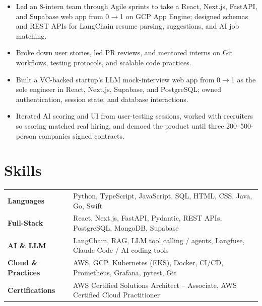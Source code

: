 \documentclass[11pt, letterpaper]{article}
\begin{document}
\vspace{1pt}
\begin{itemize}
  \item Led an 8-intern team through Agile sprints to take a React, Next.js, FastAPI, and Supabase web app from 0$\to$1 on GCP App Engine; designed schemas and REST APIs for LangChain resume parsing, suggestions, and AI job matching.
  \item Broke down user stories, led PR reviews, and mentored interns on Git workflows, testing protocols, and scalable code practices.
\end{itemize}

\vspace{1pt}
\begin{itemize}
  \item Built a VC-backed startup's LLM mock-interview web app from 0$\to$1 as the sole engineer in React, Next.js, Supabase, and PostgreSQL; owned authentication, session state, and database interactions.
  \item Iterated AI scoring and UI from user-testing sessions, worked with recruiters so scoring matched real hiring, and demoed the product until three 200--500-person companies signed contracts.
\end{itemize}

\section{Skills}
\begin{tabularx}{\textwidth}{@{}l @{\hspace{7pt}} >{\raggedright\arraybackslash}X@{}}
  \textbf{Languages} & Python, TypeScript, JavaScript, SQL, HTML, CSS, Java, Go, Swift \\[1pt]
  \textbf{Full-Stack} & React, Next.js, FastAPI, Pydantic, REST APIs, PostgreSQL, MongoDB, Supabase \\[1pt]
  \textbf{AI \& LLM} & LangChain, RAG, LLM tool calling / agents, Langfuse, Claude Code / AI coding tools \\[1pt]
  \textbf{Cloud \& Practices} & AWS, GCP, Kubernetes (EKS), Docker, CI/CD, Prometheus, Grafana, pytest, Git \\[1pt]
  \textbf{Certifications} & AWS Certified Solutions Architect -- Associate, AWS Certified Cloud Practitioner \\
\end{tabularx}
\end{document}
